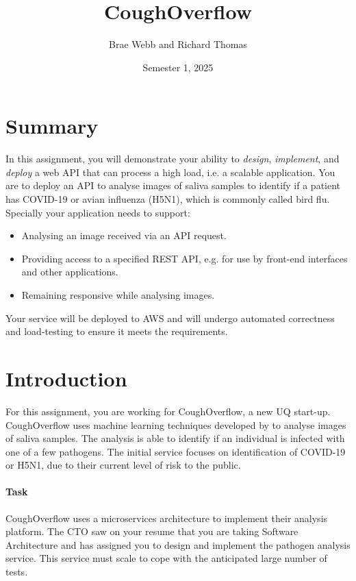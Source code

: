 \documentclass{csse4400}
\title{CoughOverflow}
\author{Brae Webb and Richard Thomas}
\date{Semester 1, 2025}
\begin{document}

\maketitle


\section*{Summary}
In this assignment, you will demonstrate your ability to \textit{design},
\textit{implement}, and \textit{deploy} a web API that can process a high load,
i.e. a scalable application.
You are to deploy an API to analyse images of saliva samples to identify if a patient has COVID-19
or avian influenza (H5N1), which is commonly called bird flu.
Specially your application needs to support:
\begin{itemize}
    \item Analysing an image received via an API request.
    \item Providing access to a specified REST API, e.g. for use by front-end interfaces and other applications.
    \item Remaining responsive while analysing images.
\end{itemize}

\noindent
Your service will be deployed to AWS and will undergo automated correctness and load-testing to ensure it meets the requirements.


\section{Introduction}

For this assignment, you are working for CoughOverflow, a new UQ start-up.
CoughOverflow uses machine learning techniques developed by
to analyse images of saliva samples.
The analysis is able to identify if an individual is infected with one of a few pathogens.
The initial service focuses on identification of COVID-19 or H5N1,
due to their current level of risk to the public.

\paragraph{Task}
CoughOverflow uses a microservices architecture to implement their analysis platform.
The CTO saw on your resume that you are taking Software Architecture
and has assigned you to design and implement the pathogen analysis service.
This service must scale to cope with the anticipated large number of tests.
\end{document}
